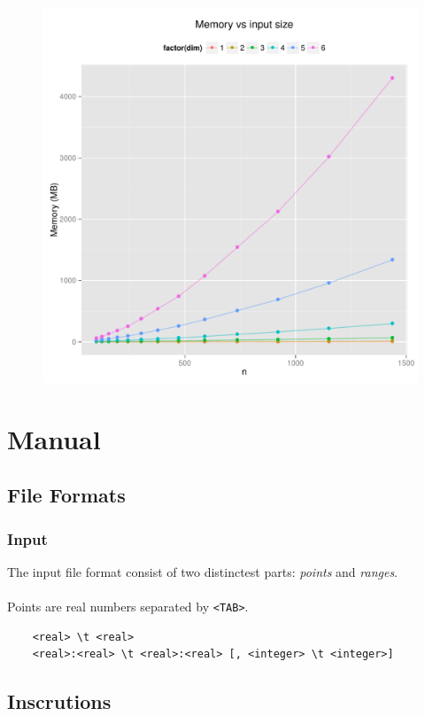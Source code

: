 \documentclass{article}
\begin{document}
\begin{figure}[H]
    \centering
    \includegraphics[width=\textwidth]{../src/R/plots/rtmem.pdf}
\end{figure}
\section{Manual}
  \subsection{File Formats}
  \subsubsection{Input}
  The input file format consist of two distinctest parts: \textit{points} and 
  \textit{ranges}. 
  \\
  \\
  Points are real numbers separated by \verb|<TAB>|. 
  \begin{verbatim}
  	<real> \t <real>
  	<real>:<real> \t <real>:<real> [, <integer> \t <integer>]
  \end{verbatim}

  \subsection{Inscrutions}
\end{document}
